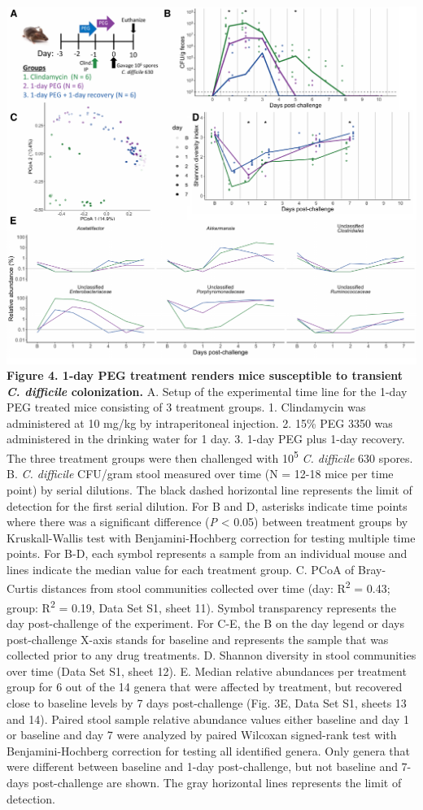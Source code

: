 \documentclass[
  11pt,
]{article}
\begin{document}
\includegraphics{figure_4.pdf} \textbf{Figure 4. 1-day PEG treatment
renders mice susceptible to transient \emph{C. difficile} colonization.}
A. Setup of the experimental time line for the 1-day PEG treated mice
consisting of 3 treatment groups. 1. Clindamycin was administered at 10
mg/kg by intraperitoneal injection. 2. 15\% PEG 3350 was administered in
the drinking water for 1 day. 3. 1-day PEG plus 1-day recovery. The
three treatment groups were then challenged with 10\textsuperscript{5}
\emph{C. difficile} 630 spores. B. \emph{C. difficile} CFU/gram stool
measured over time (N = 12-18 mice per time point) by serial dilutions.
The black dashed horizontal line represents the limit of detection for
the first serial dilution. For B and D, asterisks indicate time points
where there was a significant difference (\emph{P} \textless{} 0.05)
between treatment groups by Kruskall-Wallis test with Benjamini-Hochberg
correction for testing multiple time points. For B-D, each symbol
represents a sample from an individual mouse and lines indicate the
median value for each treatment group. C. PCoA of Bray-Curtis distances
from stool communities collected over time (day: R\textsuperscript{2} =
0.43; group: R\textsuperscript{2} = 0.19, Data Set S1, sheet 11). Symbol
transparency represents the day post-challenge of the experiment. For
C-E, the B on the day legend or days post-challenge X-axis stands for
baseline and represents the sample that was collected prior to any drug
treatments. D. Shannon diversity in stool communities over time (Data
Set S1, sheet 12). E. Median relative abundances per treatment group for
6 out of the 14 genera that were affected by treatment, but recovered
close to baseline levels by 7 days post-challenge (Fig. 3E, Data Set S1,
sheets 13 and 14). Paired stool sample relative abundance values either
baseline and day 1 or baseline and day 7 were analyzed by paired
Wilcoxan signed-rank test with Benjamini-Hochberg correction for testing
all identified genera. Only genera that were different between baseline
and 1-day post-challenge, but not baseline and 7-days post-challenge are
shown. The gray horizontal lines represents the limit of detection.
\end{document}
